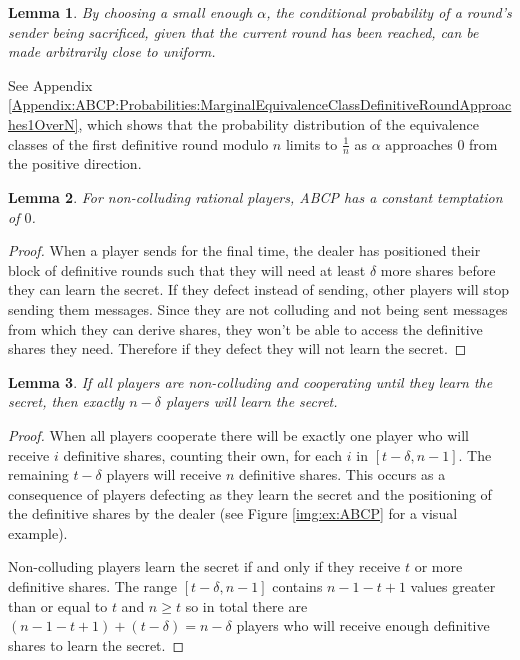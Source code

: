 \documentclass[12pt]{dalcsthesis}
\newtheorem{lemma}{Lemma}
\begin{document}
\begin{lemma}\label{Lem:ABCP:FairerDuringWithSmallAlpha}By choosing a small enough $\alpha$, the conditional probability of a round's sender being sacrificed, given that the current round has been reached, can be made arbitrarily close to uniform.\end{lemma}
See Appendix \ref{Appendix:ABCP:Probabilities:MarginalEquivalenceClassDefinitiveRoundApproaches1OverN}, which shows that the probability distribution of the equivalence classes of the first definitive round modulo $n$ limits to $\frac{1}{n}$ as $\alpha$ approaches $0$ from the positive direction.

\begin{lemma}\label{Lem:ABCP:SoloTemptNone}For non-colluding rational players, ABCP has a constant temptation of $0$.\end{lemma}
\begin{proof}
When a player sends for the final time, the dealer has positioned their block of definitive rounds such that they will need at least $\delta$ more shares before they can learn the secret. If they defect instead of sending, other players will stop sending them messages. Since they are not colluding and not being sent messages from which they can derive shares, they won't be able to access the definitive shares they need. Therefore if they defect they will not learn the secret.
\end{proof}

\begin{lemma}\label{Lem:ABCP:AllDeltaLose}If all players are non-colluding and cooperating until they learn the secret, then exactly $n-\delta$ players will learn the secret.\end{lemma}
\begin{proof}
When all players cooperate there will be exactly one player who will receive $i$ definitive shares, counting their own, for each $i$ in $[t-\delta, n-1]$. The remaining $t-\delta$ players will receive $n$ definitive shares. This occurs as a consequence of players defecting as they learn the secret and the positioning of the definitive shares by the dealer (see Figure \ref{img:ex:ABCP} for a visual example).

Non-colluding players learn the secret if and only if they receive $t$ or more definitive shares. The range $[t-\delta, n-1]$ contains $n-1-t+1$ values greater than or equal to $t$ and $n \geq t$ so in total there are $(n-1-t+1) + (t-\delta) = n-\delta$ players who will receive enough definitive shares to learn the secret.
\end{proof}
\end{document}
